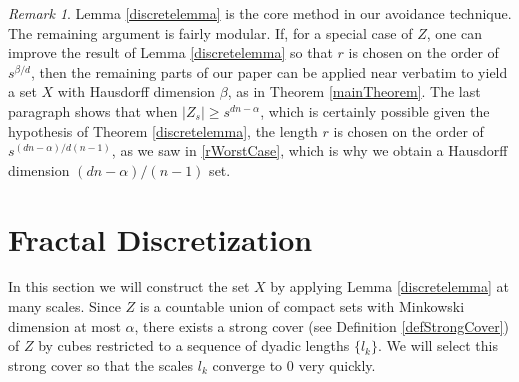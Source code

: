 \documentclass[dvipsnames,letterpaper,12pt]{article}
\numberwithin{equation}{section}
\theoremstyle{plain}
\theoremstyle{remark}
\newtheorem*{remark}{Remark}
\begin{document}
\begin{remark}
	Lemma \ref{discretelemma} is the core method in our avoidance technique. The remaining argument is fairly modular. If, for a special case of $Z$, one can improve the result of Lemma \ref{discretelemma} so that $r$ is chosen on the order of $s^{\beta/d}$, then the remaining parts of our paper can be applied near verbatim to yield a set $X$ with Hausdorff dimension $\beta$, as in Theorem \ref{mainTheorem}. The last paragraph shows that when $|Z_s| \geq s^{dn - \alpha}$, which is certainly possible given the hypothesis of Theorem \ref{discretelemma}, the length $r$ is chosen on the order of $s^{(dn-\alpha)/d(n-1)}$, as we saw in \eqref{rWorstCase}, which is why we obtain a Hausdorff dimension $(dn - \alpha)/(n-1)$ set.
\end{remark}










\section{Fractal Discretization}\label{discretizationsection}
In this section we will construct the set $X$ by applying Lemma \ref{discretelemma} at many scales. Since $Z$ is a countable union of compact sets with Minkowski dimension at most $\alpha$, there exists a strong cover (see Definition \ref{defStrongCover}) of $Z$ by cubes restricted to a sequence of dyadic lengths $\{ l_k \}$. We will select this strong cover so that the scales $l_k$ converge to 0 very quickly.
\end{document}
